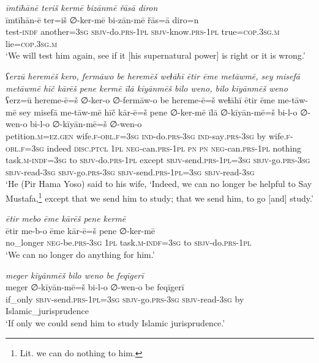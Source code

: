 \ea \label{ŽP.64}
\textit{īmtīhānē teriš kermē bizānmē řāsā diron} \\ 
\gll īmtīhān-ē ter=iš ∅-ker-mē bi-zān-mē řās=ā diro=n \\ 
 test\textsc{-indf} another\textsc{=3sg} \textsc{sbjv-}do\textsc{.prs}\textsc{-1pl} \textsc{sbjv-}know\textsc{.prs}\textsc{-1pl} true\textsc{=cop}\textsc{.3sg}\textsc{.m} lie\textsc{=cop}\textsc{.3sg}\textsc{.m} \\ 
\glt `We will test him again, see if it [his supernatural power] is right or it is wrong.'
\z 
 
\ea \label{ŽP.72}
\textit{ʕerzū heremēš kero, fermāwo be heremēš weɫāhī ētir ēme metāwmē, sey misefā metāwmē hīč kārēš pene kermē īlā kīyānmēš bilo weno, bilo kīyānmēš weno} \\ 
\gll ʕerz=ū hereme-ē=š ∅-ker-o ∅-fermāw-o be hereme-ē=š weɫāhī ētir ēme me-tāw-mē sey misefā me-tāw-mē hīč kār-ē=š pene ∅-ker-mē īlā ∅-kīyān-mē=š bi-l-o ∅-wen-o bi-l-o ∅-kīyān-mē=š ∅-wen-o \\ 
 petition\textsc{.m}\textsc{\textsc{=ez.gen}} wife\textsc{.f}\textsc{-obl}\textsc{.f}\textsc{=3sg} \textsc{ind-}do\textsc{.prs}\textsc{-3sg} \textsc{ind-}say\textsc{.prs}\textsc{-3sg} by wife\textsc{.f}\textsc{-obl}\textsc{.f}\textsc{=3sg} indeed \textsc{disc.ptcl} \textsc{1pl} \textsc{neg-}can\textsc{.prs}\textsc{-1pl} \textsc{pn} \textsc{pn} \textsc{neg-}can\textsc{.prs}\textsc{-1pl} nothing task\textsc{.m}\textsc{-indf}\textsc{=3sg} to \textsc{sbjv-}do\textsc{.prs}\textsc{-1pl} except \textsc{sbjv-}send\textsc{.prs}\textsc{-1pl}\textsc{=3sg} \textsc{sbjv-}go\textsc{.prs}\textsc{-3sg} \textsc{sbjv-}read\textsc{-3sg} \textsc{sbjv-}go\textsc{.prs}\textsc{-3sg} \textsc{sbjv-}send\textsc{.prs}\textsc{-1pl}\textsc{=3sg} \textsc{sbjv-}read\textsc{-3sg} \\ 
\glt `He (Pir Hama Yoso) said to his wife, ‘Indeed, we can no longer be helpful to Say Mustafa,\footnote{Lit. we can do nothing to him.} except that we send him to study; that we send him, to go [and] study.'
\z 
 
\ea \label{ŽP.75}
\textit{ētir mebo ēme kārēš pene kermē} \\ 
\gll ētir me-b-o ēme kār-ē=š pene ∅-ker-mē \\ 
 no\_longer \textsc{neg-}be\textsc{.prs}\textsc{-3sg} \textsc{1pl} task\textsc{.m}\textsc{-indf}\textsc{=3sg} to \textsc{sbjv-}do\textsc{.prs}\textsc{-1pl} \\ 
\glt `We can no longer do anything for him.'
\z 
 
\ea \label{ŽP.78}
\textit{meger kīyānmēš bilo weno be feqīgerī} \\ 
\gll meger ∅-kīyān-mē=š bi-l-o ∅-wen-o be feqīgerī \\ 
 if\_only \textsc{sbjv-}send\textsc{.prs}\textsc{-1pl}\textsc{=3sg} \textsc{sbjv-}go\textsc{.prs}\textsc{-3sg} \textsc{sbjv-}read\textsc{-3sg} by Islamic\_jurisprudence \\ 
\glt `If only we could send him to study Islamic jurisprudence.'
\z 
 
